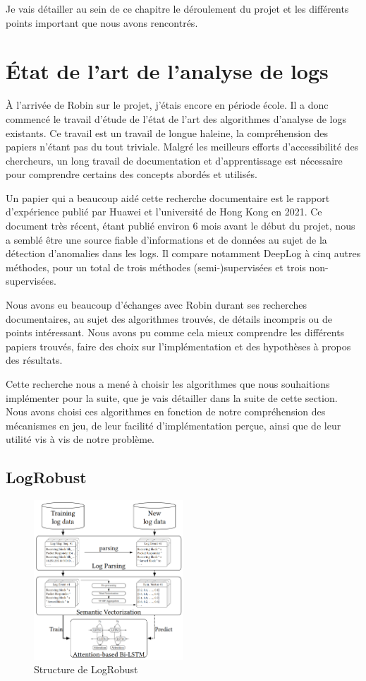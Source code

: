 \documentclass[openany, 11pt]{memoir}
\begin{document}
Je vais détailler au sein de ce chapitre le déroulement du projet et les différents points important que nous avons rencontrés.

\section{État de l'art de l'analyse de logs}

À l'arrivée de Robin sur le projet, j'étais encore en période école. Il a donc commencé le travail d'étude de l'état de l'art des algorithmes d'analyse de \glspl{log} existants. Ce travail est un travail de longue haleine, la compréhension des papiers n'étant pas du tout triviale. Malgré les meilleurs efforts d'accessibilité des chercheurs, un long travail de documentation et d'apprentissage est nécessaire pour comprendre certains des concepts abordés et utilisés.

Un papier qui a beaucoup aidé cette recherche documentaire est le rapport d'expérience \cite{experiencereport} publié par Huawei et l'université de Hong Kong en 2021. Ce document très récent, étant publié environ 6 mois avant le début du projet, nous a semblé être une source fiable d'informations et de données au sujet de la détection d'anomalies dans les logs. Il compare notamment DeepLog à cinq autres méthodes, pour un total de trois méthodes (semi-)supervisées et trois non-supervisées.

Nous avons eu beaucoup d'échanges avec Robin durant ses recherches documentaires, au sujet des algorithmes trouvés, de détails incompris ou de points intéressant. Nous avons pu comme cela mieux comprendre les différents papiers trouvés, faire des choix sur l'implémentation et des hypothèses à propos des résultats.

\bigskip
Cette recherche nous a mené à choisir les algorithmes que nous souhaitions implémenter pour la suite, que je vais détailler dans la suite de cette section. Nous avons choisi ces algorithmes en fonction de notre compréhension des mécanismes en jeu, de leur facilité d'implémentation perçue, ainsi que de leur utilité vis à vis de notre problème.

\subsection{LogRobust}

\begin{figure}[ht]
	\centering
	\includegraphics[width=0.5\textwidth]{images/logrobust.png}
	\caption{Structure de LogRobust}
	\label{logrobust}
\end{figure}
\end{document}
